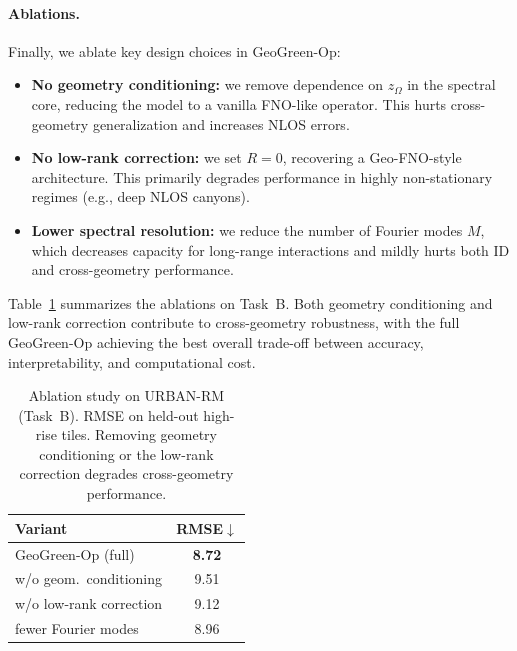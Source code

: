 \documentclass{article}
\begin{document}
\paragraph{Ablations.}
Finally, we ablate key design choices in GeoGreen-Op:

\begin{itemize}[leftmargin=1.5em, itemsep=0.1em]
\item \textbf{No geometry conditioning:}
we remove dependence on $z_\Omega$ in the spectral core,
reducing the model to a vanilla FNO-like operator.
This hurts cross-geometry generalization and increases NLOS errors.

\item \textbf{No low-rank correction:}
we set $R=0$, recovering a Geo-FNO-style architecture.
This primarily degrades performance in highly non-stationary regimes
(e.g., deep NLOS canyons).

\item \textbf{Lower spectral resolution:}
we reduce the number of Fourier modes $M$, which decreases capacity
for long-range interactions and mildly hurts both ID and cross-geometry
performance.
\end{itemize}




Table~\ref{tab:ablation} summarizes the ablations on Task~B.
Both geometry conditioning and low-rank correction contribute to
cross-geometry robustness, with the full GeoGreen-Op achieving the
best overall trade-off between accuracy, interpretability, and
computational cost.

\begin{table}[t]
\small %
\caption{Ablation study on URBAN-RM (Task~B).
RMSE on held-out high-rise tiles.
Removing geometry conditioning or the low-rank correction degrades
cross-geometry performance.}
\label{tab:ablation}
\centering
\begin{tabular}{l c}
\toprule
Variant & RMSE$\downarrow$ \\
\midrule
GeoGreen-Op (full)          & \textbf{8.72} \\
\quad w/o geom.\ conditioning & 9.51 \\
\quad w/o low-rank correction & 9.12 \\
\quad fewer Fourier modes      & 8.96 \\
\bottomrule
\end{tabular}
\end{table}


\end{document}
